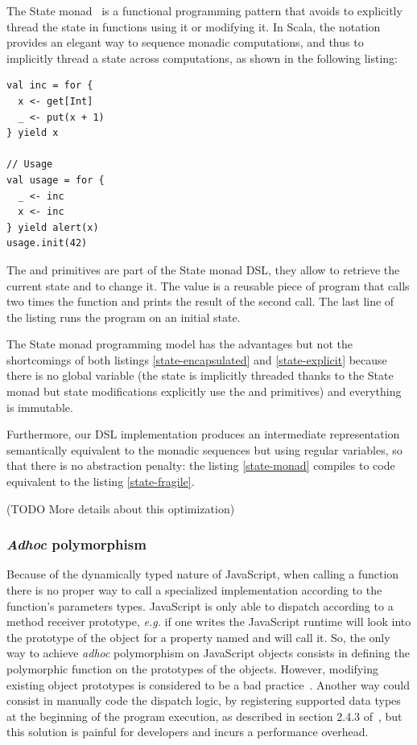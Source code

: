 \documentclass[american,english,runningheads]{llncs}
\newcommand{\eg}{\emph{e.g.}}
\begin{document}
The State monad~\cite{Wadler92_StateM} is a functional programming pattern that avoids to explicitly thread the state in functions using it or modifying it. In Scala, the  notation provides an elegant way to sequence monadic computations, and thus to implicitly thread a state across computations, as shown in the following listing:

\begin{lstlisting}[label=state-monad,caption=Implicitly threaded state using the State Monad]
val inc = for {
  x <- get[Int]
  _ <- put(x + 1)
} yield x

// Usage
val usage = for {
  _ <- inc
  x <- inc
} yield alert(x)
usage.init(42)
\end{lstlisting}

The  and  primitives are part of the State monad DSL, they allow to retrieve the current state and to change it. The  value is a reusable piece of program that calls two times the  function and prints the result of the second call. The last line of the listing runs the  program on an initial state.

The State monad programming model has the advantages but not the shortcomings of both listings \ref{state-encapsulated} and \ref{state-explicit} because there is no global variable (the state is implicitly threaded thanks to the State monad but state modifications explicitly use the  and  primitives) and everything is immutable.

Furthermore, our DSL implementation produces an intermediate representation semantically equivalent to the monadic sequences but using regular variables, so that there is no abstraction penalty: the listing \ref{state-monad} compiles to code equivalent to the listing \ref{state-fragile}.

(TODO More details about this optimization)

\subsubsection{\emph{Adhoc} polymorphism}

Because of the dynamically typed nature of JavaScript, when calling a function there is no proper way to call a specialized implementation according to the function’s parameters types. JavaScript is only able to dispatch according to a method receiver prototype, \eg{} if one writes  the JavaScript runtime will look into the prototype of the  object for a property named  and will call it. So, the only way to achieve \emph{adhoc} polymorphism on JavaScript objects consists in defining the polymorphic function on the prototypes of the objects. However, modifying existing object prototypes is considered to be a bad practice~\cite{Zakas12_MaintainableJs}. Another way could consist in manually code the dispatch logic, by registering supported data types at the beginning of the program execution, as described in section 2.4.3 of~\cite{Abelson83_SICP}, but this solution is painful for developers and incurs a performance overhead.
\end{document}
